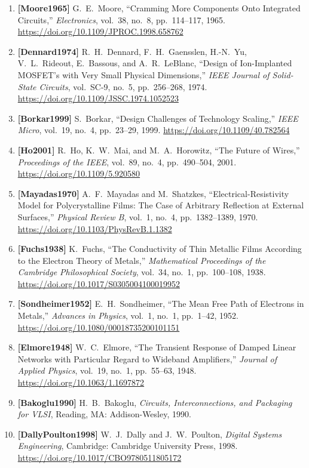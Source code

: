 \begin{enumerate}
    \item \textbf{[Moore1965]} G.~E.~Moore, ``Cramming More Components Onto Integrated Circuits,'' \emph{Electronics}, vol.~38, no.~8, pp.~114--117, 1965. \url{https://doi.org/10.1109/JPROC.1998.658762}
    \item \textbf{[Dennard1974]} R.~H.~Dennard, F.~H.~Gaensslen, H.-N.~Yu, V.~L.~Rideout, E.~Bassous, and A.~R.~LeBlanc, ``Design of Ion-Implanted MOSFET's with Very Small Physical Dimensions,'' \emph{IEEE Journal of Solid-State Circuits}, vol.~SC-9, no.~5, pp.~256--268, 1974. \url{https://doi.org/10.1109/JSSC.1974.1052523}
    \item \textbf{[Borkar1999]} S.~Borkar, ``Design Challenges of Technology Scaling,'' \emph{IEEE Micro}, vol.~19, no.~4, pp.~23--29, 1999. \url{https://doi.org/10.1109/40.782564}
    \item \textbf{[Ho2001]} R.~Ho, K.~W.~Mai, and M.~A.~Horowitz, ``The Future of Wires,'' \emph{Proceedings of the IEEE}, vol.~89, no.~4, pp.~490--504, 2001. \url{https://doi.org/10.1109/5.920580}
    \item \textbf{[Mayadas1970]} A.~F.~Mayadas and M.~Shatzkes, ``Electrical-Resistivity Model for Polycrystalline Films: The Case of Arbitrary Reflection at External Surfaces,'' \emph{Physical Review B}, vol.~1, no.~4, pp.~1382--1389, 1970. \url{https://doi.org/10.1103/PhysRevB.1.1382}
    \item \textbf{[Fuchs1938]} K.~Fuchs, ``The Conductivity of Thin Metallic Films According to the Electron Theory of Metals,'' \emph{Mathematical Proceedings of the Cambridge Philosophical Society}, vol.~34, no.~1, pp.~100--108, 1938. \url{https://doi.org/10.1017/S0305004100019952}
    \item \textbf{[Sondheimer1952]} E.~H.~Sondheimer, ``The Mean Free Path of Electrons in Metals,'' \emph{Advances in Physics}, vol.~1, no.~1, pp.~1--42, 1952. \url{https://doi.org/10.1080/00018735200101151}
    \item \textbf{[Elmore1948]} W.~C.~Elmore, ``The Transient Response of Damped Linear Networks with Particular Regard to Wideband Amplifiers,'' \emph{Journal of Applied Physics}, vol.~19, no.~1, pp.~55--63, 1948. \url{https://doi.org/10.1063/1.1697872}
    \item \textbf{[Bakoglu1990]} H.~B.~Bakoglu, \emph{Circuits, Interconnections, and Packaging for VLSI}, Reading, MA: Addison-Wesley, 1990.
    \item \textbf{[DallyPoulton1998]} W.~J.~Dally and J.~W.~Poulton, \emph{Digital Systems Engineering}, Cambridge: Cambridge University Press, 1998. \url{https://doi.org/10.1017/CBO9780511805172}

\end{enumerate}
